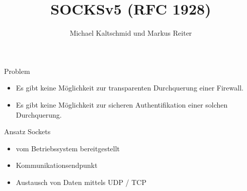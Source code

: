 \documentclass[t]{beamer}
\title{SOCKSv5 (RFC 1928)}
\author{Michael Kaltschmid und Markus Reiter}
\date{\printdate{2017-06-13}}
\begin{document}
  \RaggedRight

  \maketitle

  \begin{frame}{Problem}
    \begin{itemize}
      \item Es gibt keine Möglichkeit zur transparenten Durchquerung einer Firewall.
      \item Es gibt keine Möglichkeit zur sicheren Authentifikation einer solchen Durchquerung.
    \end{itemize}
  \end{frame}

  \begin{frame}{Ansatz Sockets}
    \begin{itemize}
      \item vom Betriebssystem bereitgestellt
      \item Kommunikationsendpunkt
      \item Austausch von Daten mittels UDP / TCP
    \end{itemize}
  \end{frame}
\end{document}
